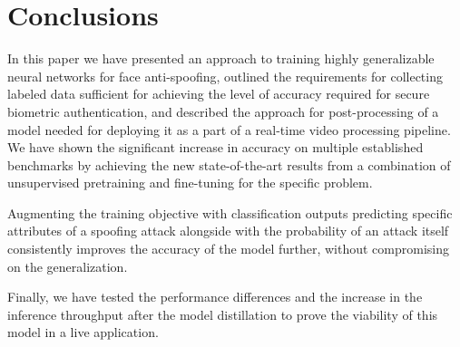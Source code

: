 \documentclass[10pt,twocolumn,letterpaper]{article}
\begin{document}
\section{Conclusions}

In this paper we have presented an approach to training highly generalizable neural networks for face anti-spoofing, outlined the requirements for collecting labeled data sufficient for achieving the level of accuracy required for secure biometric authentication, and described the approach for post-processing of a model needed for deploying it as a part of a real-time video processing pipeline. We have shown the significant increase in accuracy on multiple established benchmarks by achieving the new state-of-the-art results from a combination of unsupervised pretraining and fine-tuning for the specific problem.

Augmenting the training objective with classification outputs predicting specific attributes of a spoofing attack alongside with the probability of an attack itself consistently improves the accuracy of the model further, without compromising on the generalization.

Finally, we have tested the performance differences and the increase in the inference throughput after the model distillation to prove the viability of this model in a live application.

{\small


}
\end{document}
